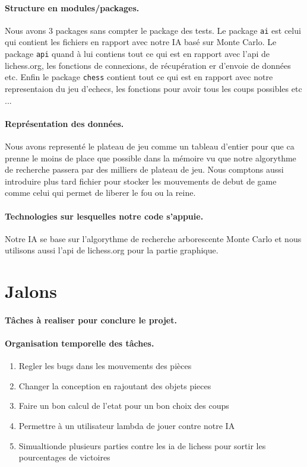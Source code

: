 \documentclass{article}
\begin{document}
\paragraph{Structure en modules/packages.} Nous avons 3 packages sans compter le package des tests. Le
package {\tt ai} est celui qui contient les fichiers en rapport avec notre IA basé sur Monte Carlo. Le package
{\tt api} quand à lui contiens tout ce qui est en rapport avec l'api de lichess.org, les fonctions de connexions,
de récupération er d'envoie de données etc. Enfin le package {\tt chess} contient tout ce qui est en rapport avec
notre representaion du jeu d'echecs, les fonctions pour avoir tous les coups possibles etc ...

\paragraph{Représentation des données.} Nous avons representé le plateau de jeu comme un tableau d'entier pour que ca prenne le moins de place que possible dans la mémoire vu que notre algorythme de recherche passera par des milliers de plateau de jeu. Nous comptons aussi introduire plus tard fichier pour stocker les mouvements de debut de game comme celui qui permet de liberer le fou ou la reine.

\paragraph{Technologies sur lesquelles notre code s'appuie.} Notre IA se base sur l'algorythme de recherche arborescente Monte Carlo et nous utilisons aussi l'api de lichess.org pour la partie graphique.

\section{Jalons}
\paragraph{Tâches à realiser pour conclure le projet.} 


\paragraph{Organisation temporelle des tâches.}
\begin{enumerate}
  \item Regler les bugs dans les mouvements des pièces
  \item Changer la conception en rajoutant des objets pieces
  \item Faire un bon calcul de l'etat pour un bon choix des coups
  \item Permettre à un utilisateur lambda de jouer contre notre IA
  \item Simualtionde  plusieurs parties contre les ia de lichess pour sortir les pourcentages de victoires
\end{enumerate}
\end{document}
